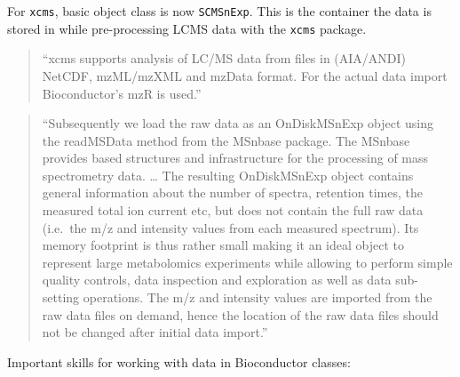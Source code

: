 \documentclass[]{tufte-book}
\begin{document}
For \texttt{xcms}, basic object class is now \texttt{SCMSnExp}. \citep{holmes2018modern}
This is the container the data is stored in while pre-processing
LCMS data with the \texttt{xcms} package.

\begin{quote}
``xcms supports analysis of LC/MS data from files in (AIA/ANDI) NetCDF,
mzML/mzXML and mzData format. For the actual data import Bioconductor's mzR is used.'' \citep{smith2013lc}
\end{quote}

\begin{quote}
``Subsequently we load the raw data as an OnDiskMSnExp object using the readMSData method from the MSnbase package. The MSnbase provides based structures and infrastructure for the processing of mass spectrometry data.
\ldots{} The resulting OnDiskMSnExp object contains general information about the number of spectra, retention times, the measured total ion current etc, but does not contain the full raw data (i.e.~the m/z and intensity values from each measured spectrum). Its memory footprint is thus rather small making it an ideal object to represent large metabolomics experiments while allowing to perform simple quality controls, data inspection and exploration as well as data sub-setting operations. The m/z and intensity values are imported from the raw data files on demand, hence the location of the raw data files should not be changed after initial data import.''
\citep{smith2013lc}
\end{quote}

Important skills for working with data in Bioconductor classes:
\end{document}
